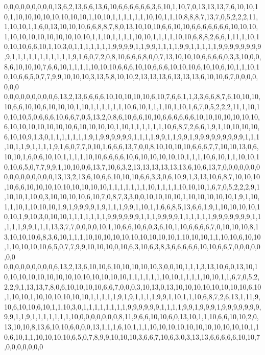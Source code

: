 0,0,0,0,0,0,0,0,0,13,6,2,13,6,6,13,6,10,6,6,6,6,6,6,3,6,10,1,10,7,0,13,13,13,7,6,10,10,10,1,10,10,10,10,10,10,10,10,1,10,10,1,1,1,1,1,1,10,10,1,1,10,8,8,8,7,13,7,0,5,2,2,2,11,1,10,10,1,1,6,0,13,10,10,10,6,6,8,8,7,8,0,13,10,10,10,6,6,10,10,6,6,6,6,6,6,6,10,10,10,1,10,10,10,10,10,10,10,10,10,1,1,10,1,1,1,1,10,10,1,1,1,1,10,10,6,8,8,2,6,6,1,11,1,10,10,10,10,6,6,10,1,10,3,0,1,1,1,1,1,1,1,9,9,9,9,1,1,9,9,1,1,1,1,9,9,1,1,1,1,1,9,9,9,9,9,9,9,9,9,1,1,1,1,1,1,1,1,1,1,1,9,1,6,0,7,2,0,8,10,6,6,6,8,0,0,7,13,10,10,10,6,6,6,6,0,3,3,10,0,0,8,6,10,10,10,7,6,6,10,1,1,1,1,10,10,10,6,6,6,10,10,6,6,6,10,10,10,6,10,10,6,10,1,1,10,10,10,6,6,5,0,7,7,9,9,10,10,10,3,13,5,8,10,10,2,13,13,13,6,13,13,13,6,10,10,6,7,0,0,0,0,0,0,0
0,0,0,0,0,0,0,0,0,6,13,2,13,6,6,6,6,10,10,10,10,10,6,10,7,6,6,1,1,3,3,6,6,8,7,6,10,10,10,10,6,6,10,10,6,10,10,10,1,10,1,1,1,1,1,1,10,6,10,1,1,1,10,1,10,1,6,7,0,5,2,2,2,11,1,10,10,10,10,5,0,6,6,6,10,6,6,7,0,5,13,2,0,8,6,10,6,6,10,10,6,6,6,6,6,6,10,10,10,10,10,10,10,6,10,10,10,10,10,10,10,6,10,10,10,10,1,10,1,1,1,1,1,1,10,6,8,7,2,6,6,1,9,1,10,10,10,10,6,10,10,9,1,3,0,1,1,1,1,1,1,1,9,1,9,9,9,9,9,9,1,1,1,1,9,9,1,1,9,9,1,9,9,9,9,9,9,9,9,9,1,1,1,10,1,1,9,1,1,1,1,9,1,6,0,7,7,0,10,1,6,6,6,13,7,0,0,8,10,10,10,10,6,6,6,7,7,10,10,13,0,6,10,10,1,6,0,6,10,10,1,1,1,1,10,10,6,6,6,6,10,6,10,10,10,10,10,1,1,1,10,6,10,1,1,10,10,10,10,6,5,0,7,7,9,9,1,10,10,0,6,13,7,10,6,3,2,13,13,13,13,13,13,6,10,6,13,7,0,0,0,0,0,0,0
0,0,0,0,0,0,0,0,0,13,13,2,13,6,10,6,6,10,10,10,6,6,3,3,0,6,10,9,1,3,13,10,6,8,7,10,10,10,10,6,6,10,10,10,10,10,10,10,10,10,1,1,1,1,1,1,1,10,1,1,1,1,10,10,10,1,6,7,0,5,2,2,2,9,1,10,10,1,10,0,3,10,10,10,10,6,10,7,0,8,7,3,3,0,0,10,10,10,10,1,10,10,10,10,10,1,9,1,10,1,1,10,1,10,10,10,1,9,1,9,9,9,9,1,9,1,1,1,9,9,1,10,1,1,6,6,8,5,13,6,6,1,9,1,10,10,10,10,10,10,1,9,10,3,0,10,10,1,1,1,1,1,1,1,9,9,9,9,9,9,1,1,1,9,9,9,9,1,1,1,1,1,1,9,9,9,9,9,9,9,1,1,1,1,1,9,9,1,1,1,13,3,7,7,0,0,0,0,10,1,10,6,6,10,6,0,3,6,10,1,10,6,6,6,6,7,0,10,10,10,8,13,10,10,10,6,8,3,6,10,1,1,1,10,10,10,10,10,10,10,10,10,10,1,10,10,10,1,1,10,10,6,10,10,1,10,10,10,10,6,5,0,7,7,9,9,10,10,10,0,10,6,3,10,6,3,8,3,6,6,6,6,6,10,10,6,6,7,0,0,0,0,0,0,0
0,0,0,0,0,0,0,0,0,6,13,2,13,6,10,10,6,10,10,10,10,10,3,0,0,10,1,1,1,3,13,10,6,0,13,10,10,10,10,10,10,10,10,10,10,10,10,10,10,10,1,1,1,1,1,1,10,10,1,1,1,1,10,10,1,1,6,7,0,5,2,2,2,9,1,13,13,7,8,0,6,10,10,10,10,6,6,7,0,0,0,3,10,13,0,13,10,10,10,10,10,10,10,10,6,10,1,10,10,1,10,10,10,10,10,10,1,1,1,1,1,9,1,9,1,1,1,1,9,9,1,10,1,1,10,6,8,7,2,6,13,1,11,9,10,6,10,10,6,10,1,1,10,3,0,1,1,1,1,1,1,1,1,9,9,9,9,9,9,1,1,1,1,9,9,1,9,9,9,1,9,9,9,9,9,9,9,9,9,1,1,9,1,1,1,1,1,1,1,10,0,0,0,0,0,0,0,8,11,9,6,6,10,10,6,0,13,10,1,1,10,6,6,10,10,2,0,13,10,10,8,13,6,10,10,6,0,0,0,13,1,1,1,6,10,1,1,1,10,10,10,10,10,10,10,10,10,10,10,1,10,6,10,1,1,10,10,10,10,6,5,0,7,8,9,9,10,10,10,3,6,6,7,10,6,3,0,3,13,13,6,6,6,6,6,10,10,7,0,0,0,0,0,0,0
